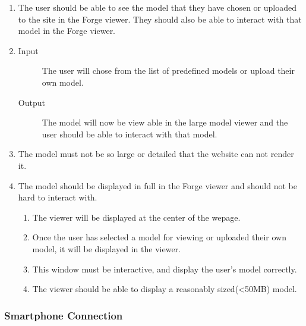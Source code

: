 \documentclass[letterpaper, 10pt, draftclsnofoot, compsoc, onecolumn]{IEEEtran}
\begin{document}
\begin{enumerate}
	\item	The user should be able to see the model that they have chosen or uploaded to the site in the Forge viewer. They 
	should also be able to interact with that model in the Forge viewer. 

	\item
	\begin{description}
		\item[Input] The user will chose from the list of predefined models or upload their own model. 
		\item[Output] The model will now be view able in the large model viewer and the user should be able to interact with that model.
	\end{description}

	\item The model must not be so large or detailed that the website can not render it.

	\item The model should be displayed in full in the Forge viewer and should not be hard to interact with. 

	\begin{enumerate}
		\item The viewer will be displayed at the center of the wepage.
		\item Once the user has selected a model for viewing or uploaded their own model, it will be displayed in the viewer. 
		\item This window must be interactive, and display the user's model correctly.
		\item The viewer should be able to display a reasonably sized(<50MB) model. 
	\end{enumerate}
\end{enumerate}

\subsubsection{Smartphone Connection}
\end{document}
